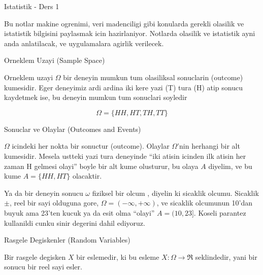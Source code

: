 \documentclass[12pt,fleqn]{article}
\begin{document}
Istatistik - Ders 1

Bu notlar makine ogrenimi, veri madenciligi gibi konularda gerekli olasilik
ve istatistik bilgisini paylasmak icin hazirlaniyor. Notlarda olasilik ve
istatistik ayni anda anlatilacak, ve uygulamalara agirlik verilecek. 

Orneklem Uzayi (Sample Space)

Orneklem uzayi $\Omega$ bir deneyin mumkun tum olasiliksal sonuclarin
(outcome) kumesidir. Eger deneyimiz ardi ardina iki kere yazi (T) tura (H)
atip sonucu kaydetmek ise, bu deneyin mumkun tum sonuclari soyledir

\[\Omega = \{HH,HT,TH,TT\} \]

Sonuclar ve Olaylar (Outcomes and Events)

$\Omega$ icindeki her nokta bir sonuctur (outcome). Olaylar $\Omega$'nin
herhangi bir alt kumesidir. Mesela ustteki yazi tura deneyinde ``iki atisin
icinden ilk atisin her zaman H gelmesi olayi'' boyle bir alt kume
olusturur, bu olaya $A$ diyelim, ve bu kume $A = \{HH,HT\}$ olacaktir. 

Ya da bir deneyin sonucu $\omega$ fiziksel bir olcum , diyelin ki sicaklik
olcumu. Sicaklik $\pm$, reel bir sayi olduguna gore, $\Omega = (-\infty,
+\infty)$, ve
sicaklik olcumunun 10'dan buyuk ama 23'ten kucuk ya da esit
olma ``olayi'' $A = (10,23]$. Koseli parantez kullanildi cunku sinir
degerini dahil ediyoruz. 

Rasgele Degiskenler (Random Variables)

Bir rasgele degisken $X$ bir eslemedir, ki bu esleme $X: \Omega \to \Re$
seklindedir, yani bir sonucu bir reel sayi esler. 
\end{document}
